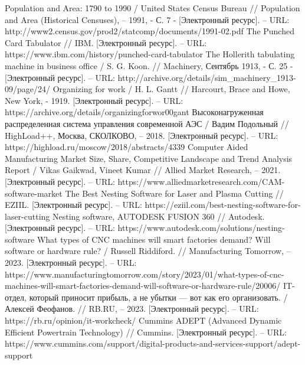 \documentclass{article}
\begin{document}
\begin{thebibliography}{2}
 Population and Area: 1790 to 1990 / United States Census Bureau // Population and Area (Historical Censuses), – 1991, - С. 7 - [Электронный ресурс]. – URL:  http://www2.census.gov/prod2/statcomp/documents/1991-02.pdf
 The Punched Card Tabulator // IBM. [Электронный ресурс]. – URL: https://www.ibm.com/history/punched-card-tabulator
 The Hollerith tabulating machine in business office / S. G. Koon. // Machinery, Сентябрь 1913, - С. 25 - [Электронный ресурс]. – URL: http://archive.org/details/sim\_machinery\_1913-09/page/24/
 Organizing for work / H. L. Gantt // Harcourt, Brace and Howe, New York, - 1919. [Электронный ресурс]. – URL: https://archive.org/details/organizingforwor00gant
 Высоконагруженная распределенная система управления современной АЭС / Вадим Подольный // HighLoad++, Москва, СКОЛКОВО, – 2018. [Электронный ресурс]. – URL: https://highload.ru/moscow/2018/abstracts/4339
 Computer Aided Manufacturing Market Size, Share, Competitive Landscape and Trend Analysis Report / Vikas Gaikwad, Vineet Kumar // Allied Market Research, – 2021. [Электронный ресурс]. – URL: https://www.alliedmarketresearch.com/CAM-software-market
 The Best Nesting Software for Laser and Plasma Cutting // EZIIL. [Электронный ресурс]. – URL: https://eziil.com/best-nesting-software-for-laser-cutting
 Nesting software, AUTODESK FUSION 360 // Autodesk. [Электронный ресурс]. – URL: https://www.autodesk.com/solutions/nesting-software
 What types of CNC machines will smart factories demand? Will software or hardware rule? / Russell Riddiford. // Manufacturing Tomorrow, – 2023. [Электронный ресурс]. – URL: https://www.manufacturingtomorrow.com/story/2023/01/what-types-of-cnc-machines-will-smart-factories-demand-will-software-or-hardware-rule/20006/
 IT-отдел, который приносит прибыль, а не убытки — вот как его организовать. / Алексей Феофанов. // RB.RU, – 2023. [Электронный ресурс]. – URL: https://rb.ru/opinion/it-workcheck/
 Cummins ADEPT (Advanced Dynamic Efficient Powertrain Technology) // Cummins. [Электронный ресурс]. – URL: https://www.cummins.com/support/digital-products-and-services-support/adept-support

\end{thebibliography}
\end{document}
